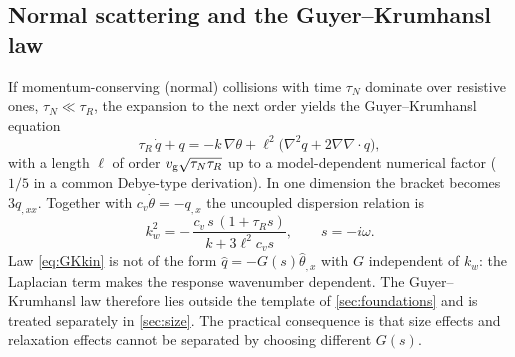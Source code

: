 \subsection{Normal scattering and the Guyer--Krumhansl law}
If momentum-conserving (normal) collisions with time $\tau_N$ dominate over resistive ones, $\tau_N\ll\tau_R$, the expansion to the next order yields the Guyer--Krumhansl equation
\begin{equation}\label{eq:GKkin}
\tau_R\,\dot q+q=-k\,\nabla\theta+\ell^{2}\bigl(\nabla^{2}q+2\nabla\nabla\!\cdot q\bigr),
\end{equation}
with a length $\ell$ of order $v_{\rm g}\sqrt{\tau_N\tau_R}$ up to a model-dependent numerical factor ($1/5$ in a common Debye-type derivation). In one dimension the bracket becomes $3q_{,xx}$. Together with $c_v\dot\theta=-q_{,x}$ the uncoupled dispersion relation is
\begin{equation}\label{eq:GKdisp}
k_w^{2}=-\,\frac{c_v\,s\,(1+\tau_R s)}{k+3\ell^{2}c_v s},\qquad s=-i\omega .
\end{equation}
Law \cref{eq:GKkin} is not of the form $\hat q=-G(s)\hat\theta_{,x}$ with $G$ independent of $k_w$: the Laplacian term makes the response wavenumber dependent. The Guyer--Krumhansl law therefore lies outside the template of \cref{sec:foundations} and is treated separately in \cref{sec:size}. The practical consequence is that size effects and relaxation effects cannot be separated by choosing different $G(s)$.


